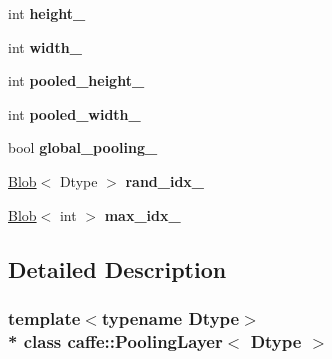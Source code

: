\begin{DoxyCompactItemize}
\item 
int {\bfseries height\+\_\+}\hypertarget{classcaffe_1_1PoolingLayer_a58ef04bbd1ee89201b07f99329538e95}{}\label{classcaffe_1_1PoolingLayer_a58ef04bbd1ee89201b07f99329538e95}

\item 
int {\bfseries width\+\_\+}\hypertarget{classcaffe_1_1PoolingLayer_a812efd53d8f67f250beeb7c79cc74cbe}{}\label{classcaffe_1_1PoolingLayer_a812efd53d8f67f250beeb7c79cc74cbe}

\item 
int {\bfseries pooled\+\_\+height\+\_\+}\hypertarget{classcaffe_1_1PoolingLayer_a21f1550ebe8a4b2a6731a7c871e1bda8}{}\label{classcaffe_1_1PoolingLayer_a21f1550ebe8a4b2a6731a7c871e1bda8}

\item 
int {\bfseries pooled\+\_\+width\+\_\+}\hypertarget{classcaffe_1_1PoolingLayer_a73ddab9147f6ad736938a55a2dc74a0d}{}\label{classcaffe_1_1PoolingLayer_a73ddab9147f6ad736938a55a2dc74a0d}

\item 
bool {\bfseries global\+\_\+pooling\+\_\+}\hypertarget{classcaffe_1_1PoolingLayer_a8b06277200752109a8aca5f53e84bd91}{}\label{classcaffe_1_1PoolingLayer_a8b06277200752109a8aca5f53e84bd91}

\item 
\hyperlink{classcaffe_1_1Blob}{Blob}$<$ Dtype $>$ {\bfseries rand\+\_\+idx\+\_\+}\hypertarget{classcaffe_1_1PoolingLayer_a03c023517f2f74771d6da233b161964a}{}\label{classcaffe_1_1PoolingLayer_a03c023517f2f74771d6da233b161964a}

\item 
\hyperlink{classcaffe_1_1Blob}{Blob}$<$ int $>$ {\bfseries max\+\_\+idx\+\_\+}\hypertarget{classcaffe_1_1PoolingLayer_a90098529d0f8e906bd9cebdfeb7b4e72}{}\label{classcaffe_1_1PoolingLayer_a90098529d0f8e906bd9cebdfeb7b4e72}

\end{DoxyCompactItemize}


\subsection{Detailed Description}
\subsubsection*{template$<$typename Dtype$>$\\*
class caffe\+::\+Pooling\+Layer$<$ Dtype $>$}

